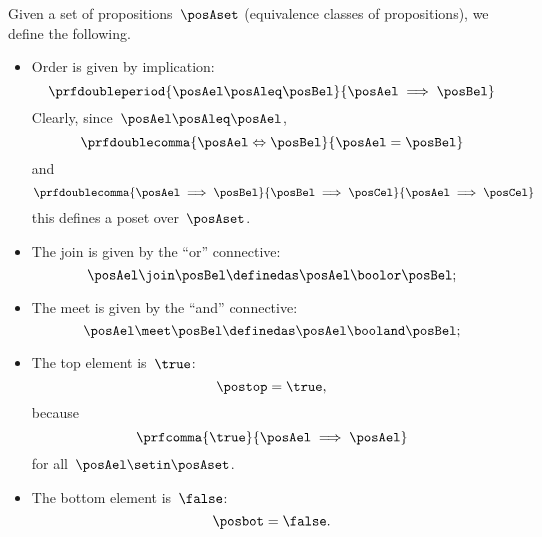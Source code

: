 \begin{ctdefinition}
    \label{def:prop-as-lattice}
    Given a set of propositions~$\posAset$ (equivalence classes of propositions), we define the following.
    \begin{itemize}
        \item Order is given by implication:
              \begin{equation}
                  \prfdoubleperiod{
                      \posAel\posAleq \posBel
                  }{
                      \posAel \implies \posBel
                  }
              \end{equation}
              Clearly, since~$\posAel \posAleq \posAel$,
              \begin{equation}
                  \prfdoublecomma{
                      \posAel \Leftrightarrow \posBel
                  }{
                      \posAel =\posBel
                  }
              \end{equation}
              and
              \begin{equation}
                  \prfdoublecomma{
                      \posAel \implies \posBel
                  }{
                      \posBel \implies \posCel
                  }{
                      \posAel \implies \posCel
                  }
              \end{equation}
              this defines a poset over~$\posAset$.
        \item The join is given by the ``or'' connective:
              \begin{equation}
                  \posAel \join \posBel \definedas \posAel \boolor \posBel;
              \end{equation}
        \item The meet is given by the ``and'' connective:
              \begin{equation}
                  \posAel \meet \posBel \definedas \posAel \booland \posBel;
              \end{equation}
        \item The top element is~$\true$:
              \begin{equation}
                  \postop = \true,
              \end{equation}
              because
              \begin{equation}
                  \prfcomma{
                      \true
                  }{
                      \posAel \implies \posAel
                  }
              \end{equation}
              for all~$\posAel\setin \posAset$.
        \item The bottom element is~$\false$:
              \begin{equation}
                  \posbot = \false.
              \end{equation}
    \end{itemize}
\end{ctdefinition}
\begin{marginfigure}
    \centering
    \caption{}
    \label{fig:prod_coprod_prop}
\end{marginfigure}

